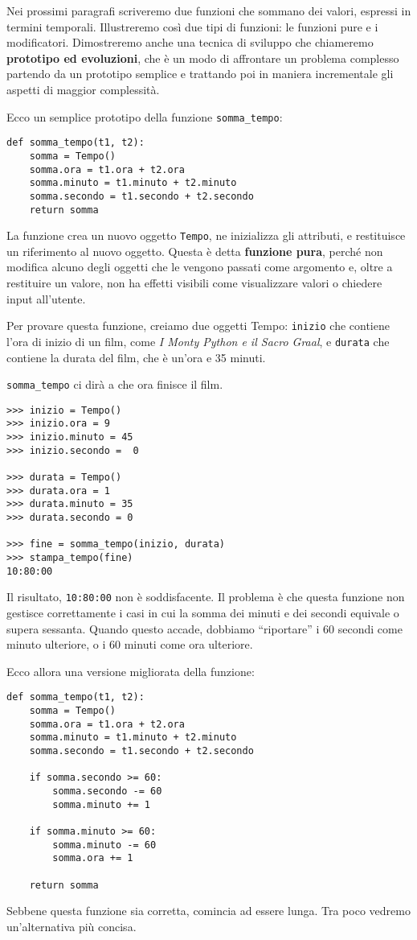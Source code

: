 \documentclass[10pt]{book}
\begin{document}
Nei prossimi paragrafi scriveremo due funzioni che sommano dei valori, espressi in termini temporali. Illustreremo così due tipi di funzioni: le funzioni pure e i modificatori. Dimostreremo anche una tecnica di sviluppo che chiameremo {\bf prototipo ed evoluzioni}, che è un modo di affrontare un problema complesso partendo da un prototipo semplice e trattando poi in maniera incrementale gli aspetti di maggior complessità.

Ecco un semplice prototipo della funzione \verb"somma_tempo":

\begin{verbatim}
def somma_tempo(t1, t2):
    somma = Tempo()
    somma.ora = t1.ora + t2.ora
    somma.minuto = t1.minuto + t2.minuto
    somma.secondo = t1.secondo + t2.secondo
    return somma
\end{verbatim}
%
La funzione crea un nuovo oggetto {\tt Tempo}, ne inizializza gli attributi, e restituisce un riferimento al nuovo oggetto. Questa è detta {\bf funzione pura},  perché non modifica alcuno degli oggetti che le vengono passati come argomento e, oltre a restituire un valore, non ha effetti visibili come visualizzare valori o chiedere input all'utente.

Per provare questa funzione, creiamo due oggetti Tempo: {\tt inizio}
che contiene l'ora di inizio di un film, come {\em I Monty Python e il Sacro Graal}, e {\tt durata} che contiene la durata del film, che è un'ora e 35 minuti.

\verb"somma_tempo" ci dirà a che ora finisce il film.

\begin{verbatim}
>>> inizio = Tempo()
>>> inizio.ora = 9
>>> inizio.minuto = 45
>>> inizio.secondo =  0

>>> durata = Tempo()
>>> durata.ora = 1
>>> durata.minuto = 35
>>> durata.secondo = 0

>>> fine = somma_tempo(inizio, durata)
>>> stampa_tempo(fine)
10:80:00
\end{verbatim}
%
Il risultato, {\tt 10:80:00} non è soddisfacente. Il problema è che questa funzione non gestisce correttamente i casi in cui la somma dei minuti e dei secondi equivale o supera sessanta. Quando questo accade, dobbiamo ``riportare'' i 60 secondi come minuto ulteriore, o i 60 minuti come ora ulteriore.

Ecco allora una versione migliorata della funzione:

\begin{verbatim}
def somma_tempo(t1, t2):
    somma = Tempo()
    somma.ora = t1.ora + t2.ora
    somma.minuto = t1.minuto + t2.minuto
    somma.secondo = t1.secondo + t2.secondo

    if somma.secondo >= 60:
        somma.secondo -= 60
        somma.minuto += 1

    if somma.minuto >= 60:
        somma.minuto -= 60
        somma.ora += 1

    return somma
\end{verbatim}
%
Sebbene questa funzione sia corretta, comincia ad essere lunga. Tra poco vedremo un'alternativa più concisa.
\end{document}

